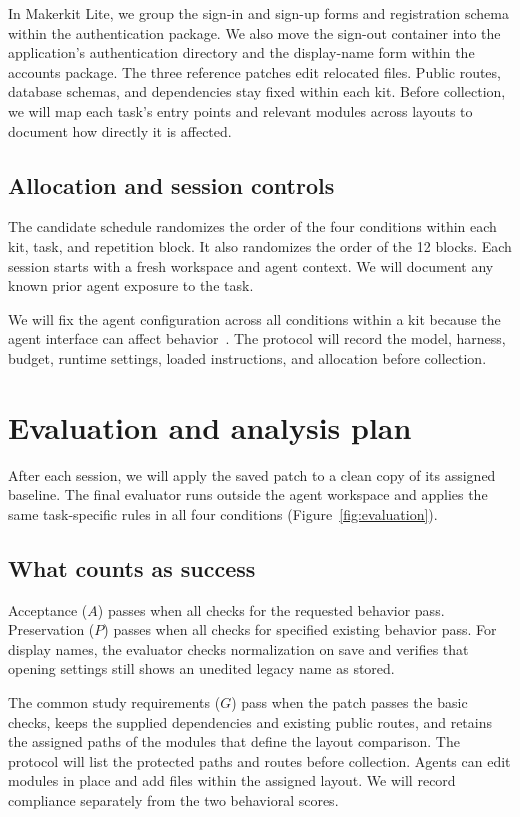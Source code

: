 \documentclass[11pt,a4paper]{article}
\begin{document}
In Makerkit Lite, we group the sign-in and sign-up forms and registration schema within the authentication package. We also move the sign-out container into the application's authentication directory and the display-name form within the accounts package. The three reference patches edit relocated files. Public routes, database schemas, and dependencies stay fixed within each kit. Before collection, we will map each task's entry points and relevant modules across layouts to document how directly it is affected.

\subsection{Allocation and session controls}
The candidate schedule randomizes the order of the four conditions within each kit, task, and repetition block. It also randomizes the order of the 12 blocks. Each session starts with a fresh workspace and agent context. We will document any known prior agent exposure to the task.

We will fix the agent configuration across all conditions within a kit because the agent interface can affect behavior~\cite{yang2024sweagent}. The protocol will record the model, harness, budget, runtime settings, loaded instructions, and allocation before collection.

\section{Evaluation and analysis plan}\label{sec:analysis}
After each session, we will apply the saved patch to a clean copy of its assigned baseline. The final evaluator runs outside the agent workspace and applies the same task-specific rules in all four conditions (Figure~\ref{fig:evaluation}).



\subsection{What counts as success}\label{sec:outcomes}
Acceptance ($A$) passes when all checks for the requested behavior pass. Preservation ($P$) passes when all checks for specified existing behavior pass. For display names, the evaluator checks normalization on save and verifies that opening settings still shows an unedited legacy name as stored.

The common study requirements ($G$) pass when the patch passes the basic checks, keeps the supplied dependencies and existing public routes, and retains the assigned paths of the modules that define the layout comparison. The protocol will list the protected paths and routes before collection. Agents can edit modules in place and add files within the assigned layout. We will record compliance separately from the two behavioral scores.
\end{document}

